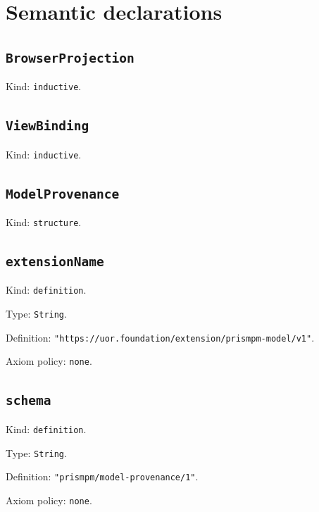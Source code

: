 \documentclass[11pt]{article}
\begin{document}
\section*{Semantic declarations}
\subsection*{\texttt{BrowserProjection}}
\noindent Kind: \texttt{inductive}.\par
\subsection*{\texttt{ViewBinding}}
\noindent Kind: \texttt{inductive}.\par
\subsection*{\texttt{ModelProvenance}}
\noindent Kind: \texttt{structure}.\par
\subsection*{\texttt{extensionName}}
\noindent Kind: \texttt{definition}.\par
\noindent Type: \texttt{String}.\par
\noindent Definition: \texttt{"https://uor.foundation/extension/prismpm-model/v1"}.\par
\noindent Axiom policy: \texttt{none}.\par
\subsection*{\texttt{schema}}
\noindent Kind: \texttt{definition}.\par
\noindent Type: \texttt{String}.\par
\noindent Definition: \texttt{"prismpm/model-provenance/1"}.\par
\noindent Axiom policy: \texttt{none}.\par
\end{document}

